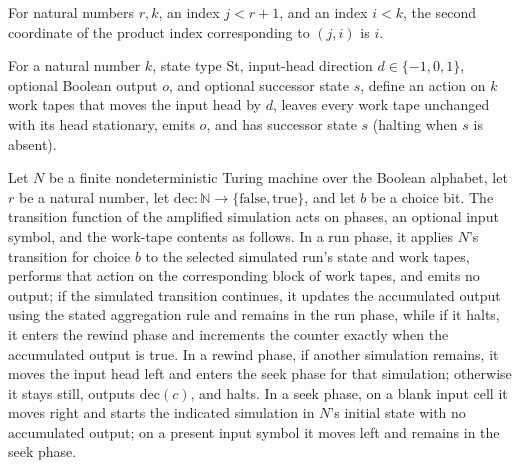 \begin{theorem}
\label{Randomized.Amplify.idx_mk}
\leanok
{}
For natural numbers $r,k$, an index $j<r+1$, and an index $i<k$, the second coordinate
of the product index corresponding to $(j,i)$ is $i$.
\end{theorem}

\begin{definition}
\label{Randomized.Amplify.idle}
\leanok
{}
For a natural number $k$, state type $\mathrm{St}$, input-head direction
$d\in\{-1,0,1\}$, optional Boolean output $o$, and optional successor state $s$, define
an action on $k$ work tapes that moves the input head by $d$, leaves every work tape
unchanged with its head stationary, emits $o$, and has successor state $s$ (halting when
$s$ is absent).
\end{definition}

\begin{definition}
\label{Randomized.Amplify.tr}
\leanok
{}
Let $N$ be a finite nondeterministic Turing machine over the Boolean alphabet, let $r$
be a natural number, let $\mathrm{dec}:\mathbb{N}\to\{\mathrm{false},\mathrm{true}\}$,
and let $b$ be a choice bit. The transition function of the amplified simulation acts on
phases, an optional input symbol, and the work-tape contents as follows. In a run phase,
it applies $N$'s transition for choice $b$ to the selected simulated run's state and
work tapes, performs that action on the corresponding block of work tapes, and emits no
output; if the simulated transition continues, it updates the accumulated output using
the stated aggregation rule and remains in the run phase, while if it halts, it enters
the rewind phase and increments the counter exactly when the accumulated output is true.
In a rewind phase, if another simulation remains, it moves the input head left and
enters the seek phase for that simulation; otherwise it stays still, outputs
$\mathrm{dec}(c)$, and halts. In a seek phase, on a blank input cell it moves right and
starts the indicated simulation in $N$'s initial state with no accumulated output; on a
present input symbol it moves left and remains in the seek phase.
\end{definition}

